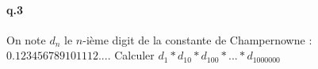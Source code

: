 \documentclass[10pt,a4paper]{article}
\begin{document}
\paragraph{q.3}On note $d_n$ le $n$-ième digit de la constante de Champernowne : $0.123456789101112...$. Calculer $d_1*d_{10}*d_{100}*...*d_{1000000}$
%
%
%
%
%
%


\end{document}
